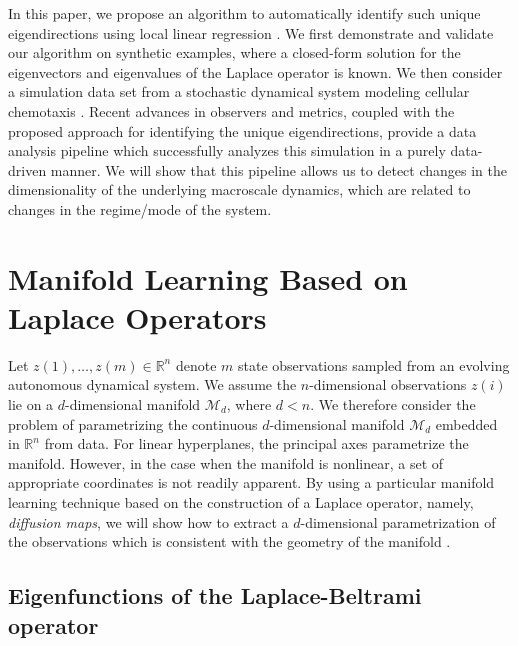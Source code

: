 \documentclass[3p]{elsarticle}
\begin{document}
In this paper, we propose an algorithm to automatically identify such unique eigendirections using local linear regression \cite{wasserman2006all}.
%
We first demonstrate and validate our algorithm on synthetic examples, where a closed-form solution for the
eigenvectors and eigenvalues of the Laplace operator is known.
%
We then consider a simulation data set from a stochastic dynamical system modeling
cellular chemotaxis \cite{othmer1988models}.
%
Recent advances in observers and metrics, coupled with the proposed approach for identifying the unique eigendirections,
provide a data analysis pipeline which successfully analyzes this simulation in a purely data-driven manner.
%
We will show that this pipeline allows us to detect changes in the dimensionality of the underlying macroscale dynamics, which are
related to changes in the regime/mode of the system.


\section{Manifold Learning Based on Laplace Operators}
%
%

Let $z(1), \dots, z(m) \in \mathbb{R}^n$ denote $m$ state observations sampled from an evolving autonomous dynamical system.
%
We assume the $n$-dimensional observations $z(i)$ lie on a $d$-dimensional manifold $\mathcal{M}_d$, where $d < n$.
%
We therefore consider the problem of parametrizing the continuous $d$-dimensional manifold $\mathcal{M}_d$ embedded in $\mathbb{R}^n$ from data.
%
For linear hyperplanes, the principal axes parametrize the manifold.
%
However, in the case when the manifold is nonlinear, a set of appropriate coordinates is not readily apparent.
%
By using a particular manifold learning technique based on the construction of a Laplace operator, namely, {\em diffusion maps}, we will show how to extract a $d$-dimensional parametrization of the observations which is consistent with the geometry of the manifold \cite{Belkin2003, coifman2005geometric, singer2008non}.

\subsection{Eigenfunctions of the Laplace-Beltrami operator}
\end{document}
